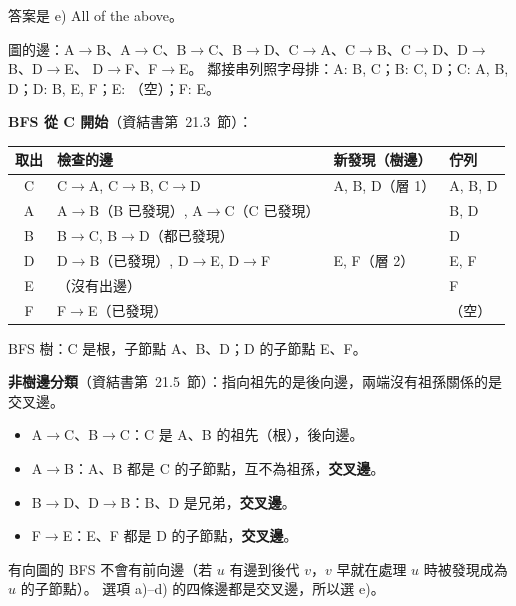 \begin{pastsoln}
答案是 e) All of the above。

圖的邊：A$\to$B、A$\to$C、B$\to$C、B$\to$D、C$\to$A、C$\to$B、C$\to$D、D$\to$B、D$\to$E、
D$\to$F、F$\to$E。 鄰接串列照字母排：A: B, C；B: C, D；C: A, B, D；D: B, E, F；E: （空）；F: E。

\textbf{BFS 從 C 開始}（資結書第~21.3~節）：
\begin{center}
\begin{tabular}{clll}
\toprule
取出 & 檢查的邊 & 新發現（樹邊） & 佇列 \\
\midrule
C & C$\to$A, C$\to$B, C$\to$D & A, B, D（層 1） & A, B, D \\
A & A$\to$B（B 已發現）, A$\to$C（C 已發現） & & B, D \\
B & B$\to$C, B$\to$D（都已發現） & & D \\
D & D$\to$B（已發現）, D$\to$E, D$\to$F & E, F（層 2） & E, F \\
E & （沒有出邊） & & F \\
F & F$\to$E（已發現） & & （空） \\
\bottomrule
\end{tabular}
\end{center}
BFS 樹：C 是根，子節點 A、B、D；D 的子節點 E、F。

\textbf{非樹邊分類}（資結書第~21.5~節）：指向祖先的是後向邊，兩端沒有祖孫關係的是交叉邊。
\begin{itemize}
\item A$\to$C、B$\to$C：C 是 A、B 的祖先（根），後向邊。
\item A$\to$B：A、B 都是 C 的子節點，互不為祖孫，\textbf{交叉邊}。
\item B$\to$D、D$\to$B：B、D 是兄弟，\textbf{交叉邊}。
\item F$\to$E：E、F 都是 D 的子節點，\textbf{交叉邊}。
\end{itemize}
有向圖的 BFS 不會有前向邊（若 $u$ 有邊到後代 $v$，$v$ 早就在處理 $u$ 時被發現成為 $u$ 的子節點）。
選項 a)--d) 的四條邊都是交叉邊，所以選 e)。
\end{pastsoln}
